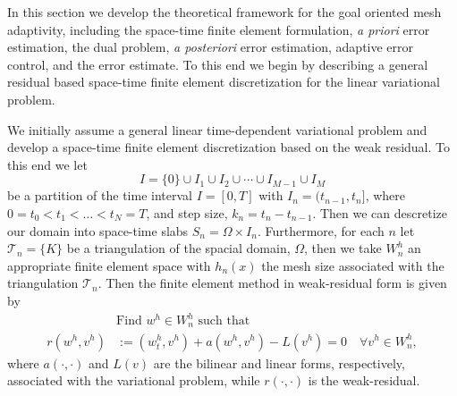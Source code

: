 In this section we develop the theoretical framework for the goal oriented mesh
adaptivity, including the space-time finite element formulation, \emph{a priori}
error estimation, the dual problem, \emph{a posteriori} error estimation,
adaptive error control, and the error estimate. To this end we begin by
describing a general residual based space-time finite element discretization for
the linear variational problem.

We initially assume a general linear time-dependent variational problem and
develop a space-time finite element discretization based on the weak residual.
To this end we let
\begin{equation*}
    I = \{0\} \cup I_1 \cup I_2 \cup \cdots \cup I_{M-1} \cup I_M
\end{equation*}
be a partition of the time interval $I = [0, T]$ with $I_n = (t_{n-1}, t_n]$,
where $0=t_0 < t_1 < \ldots < t_N = T$, and step size, $k_n = t_n - t_{n-1}$.
Then we can descretize our domain into space-time slabs $S_n = \Omega \times
I_n$. Furthermore, for each $n$ let $\mathcal{T}_n= \{K\}$ be a triangulation
of the spacial domain, $\Omega$, then we take $W_n^h$ an appropriate finite
element space with $h_n(x)$ the mesh size associated with the triangulation
$\mathcal{T}_n$. Then the finite element method in weak-residual form is given
by
\begin{equation}
    \begin{split}
        &\text{Find } w^h \in W^h_n \text{ such that} \\
        r(w^h, v^h) &:= (w^h_t, v^h) + a(w^h, v^h) - L(v^h) = 0 \quad \forall
            v^h \in W^h_n,
    \end{split}
    \label{eq:WeakResidual}
\end{equation}
where $a(\cdot, \cdot)$ and $L(v)$ are the bilinear and linear forms,
respectively, associated with the variational problem, while $r(\cdot, \cdot)$
is the weak-residual.

